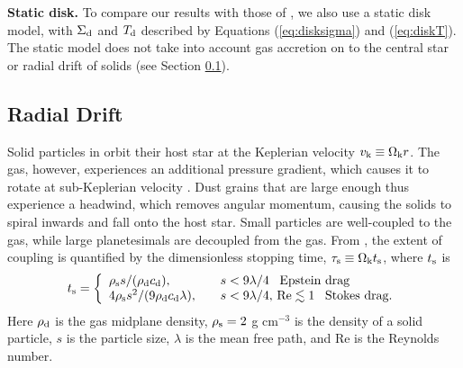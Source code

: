 \documentclass[apj]{emulateapj}
\begin{document}


\textbf{Static disk.} To compare our results with those of \citet{oberg11}, we also use a static disk model, with $\Sigma_{\rm d}$ and $T_{\rm d}$ described by Equations (\ref{eq:disksigma}) and (\ref{eq:diskT}). The static model does not take into account gas accretion on to the central star or radial drift of solids (see Section \ref{sec:drift}).


\subsection{Radial Drift}
\label{sec:drift}

Solid particles in orbit their host star at the Keplerian velocity $v_{\rm k} \equiv \Omega_{\rm k} r$. The gas, however, experiences an additional pressure gradient, which causes it to rotate at sub-Keplerian velocity \citep{weidenschilling77}. Dust grains that are large enough thus experience a headwind, which removes angular momentum, causing the solids to spiral inwards and fall onto the host star. Small particles are well-coupled to the gas, while large planetesimals are decoupled from the gas. From \citet{chiang10}, the extent of coupling is quantified by the dimensionless stopping time, $\tau_{\rm s} \equiv \Omega_{\rm k} t_{\rm s}$, where $t_{\rm s}$ is
\begin{equation}
\label{eq:ts}
t_{\rm s}= \left\{
\begin{array}{l l}
\rho_{\rm s} s / (\rho_{\rm d} c_{\rm d}), & \quad s < 9 \lambda/4 \,\,\,\ \text{Epstein drag} \\
4 \rho_{\rm s} s^2 / (9 \rho_{\rm d} c_{\rm d} \lambda), & \quad s < 9 \lambda/4, \,\text{Re} \lesssim 1 \,\,\,\ \text{Stokes drag.}
\end{array} 
\right.
\end{equation}
Here $\rho_{\rm d}$ is the gas midplane density, $\rho_{\rm s}=2$ g cm$^{-3}$ is the density of a solid particle, $s$ is the particle size, $\lambda$ is the mean free path, and Re is the Reynolds number. 
\end{document}
